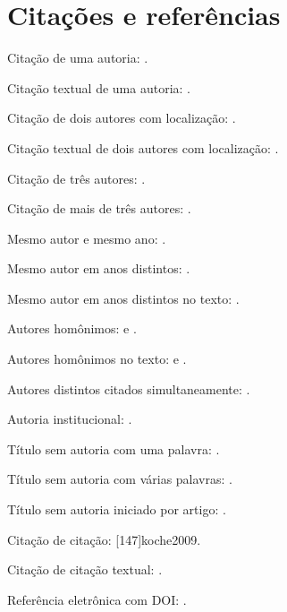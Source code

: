 \documentclass{ufctex}
\begin{document}
\tableofcontents

\section{Citações e referências}

Citação de uma autoria: \cite{silva2020}.

Citação textual de uma autoria: \textcite{silva2020}.

Citação de dois autores com localização: \cite[103]{oliveira2011}.

Citação textual de dois autores com localização: \textcite[103]{oliveira2011}.

Citação de três autores: \cite{cruz2000}.

Citação de mais de três autores: \cite[198]{rocha2021}.

Mesmo autor e mesmo ano: \cite{chiavenato2008admin,chiavenato2008gestao}.

Mesmo autor em anos distintos: \cite{rudio2002,rudio2003,rudio2007}.

Mesmo autor em anos distintos no texto: \textcite{rudio2002,rudio2003,rudio2007}.

Autores homônimos: \cite[20]{ferreiraC2007} e \cite[40]{ferreiraL2007}.

Autores homônimos no texto: \textcite[20]{ferreiraC2007} e \textcite[40]{ferreiraL2007}.

Autores distintos citados simultaneamente: \cite{silva2020,ferreira2006}.

Autoria institucional: \cite{ufc2025}.

Título sem autoria com uma palavra: \cite{acrefino1993}.

Título sem autoria com várias palavras: \cite{tribunal2011}.

Título sem autoria iniciado por artigo: \cite[5]{tunel2005}.

Citação de citação: [147]{koche2009}.

Citação de citação textual: .

Referência eletrônica com DOI: \cite{doi2025}.

\nocite{evento2025}
\imprimirreferencias
\end{document}
